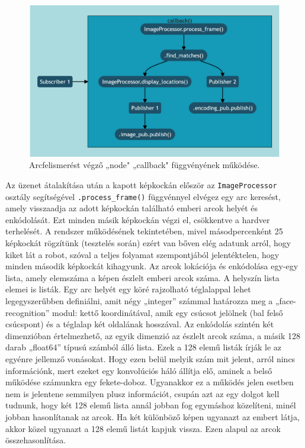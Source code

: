 \begin{figure}[!ht]
    \centering
    \includegraphics[width=125mm, keepaspectratio]{02_mermaid/face_callback.png}
    \caption{Arcfelismerést végző „node" „callback" függvényének működése.}
    \label{fig:fcb}
\end{figure}

Az üzenet átalakítása után a kapott képkockán először az \verb|ImageProcessor| osztály segítségével \verb|.process_frame()| függvénnyel elvégez egy arc keresést, amely visszaadja az adott képkockán található emberi arcok helyét és enkódolását. Ezt minden másik képkockán végzi el, csökkentve a hardver terhelését. A rendszer működésének tekintetében, mivel másodpercenként 25 képkockát rögzítünk (tesztelés során) ezért van bőven elég adatunk arról, hogy kiket lát a robot, szóval a teljes folyamat szempontjából jelentéktelen, hogy minden második képkockát kihagyunk. Az arcok lokációja és enkódolása egy-egy lista, amely elemszáma a képen észlelt emberi arcok száma. A helyszín lista elemei is listák. Egy arc helyét egy köré rajzolható téglalappal lehet legegyszerűbben definiálni, amit négy „integer” számmal határozza meg a „face-recognition” modul: kettő koordinátával, amik egy csúcsot jelölnek (bal felső csúcspont) és a téglalap két oldalának hosszával. Az enkódolás szintén két dimenzióban értelmezhető, az egyik dimenzió az észlelt arcok száma, a másik 128 darab „float64” típusú számból álló lista. Ezek a 128 elemű listák írják le az egyénre jellemző vonásokat. Hogy ezen belül melyik szám mit jelent, arról nincs információnk, mert ezeket egy konvolúciós háló állítja elő, aminek a belső működése számunkra egy fekete-doboz. Ugyanakkor ez a működés jelen esetben nem is jelentene semmilyen plusz információt, csupán azt az egy dolgot kell tudnunk, hogy két 128 elemű lista annál jobban fog egymáshoz közelíteni, minél jobban hasonlítanak az arcok. Ha két különböző képen ugyanazt az embert látja, akkor közel ugyanazt a 128 elemű listát kapjuk vissza. Ezen alapul az arcok összehasonlítása.

